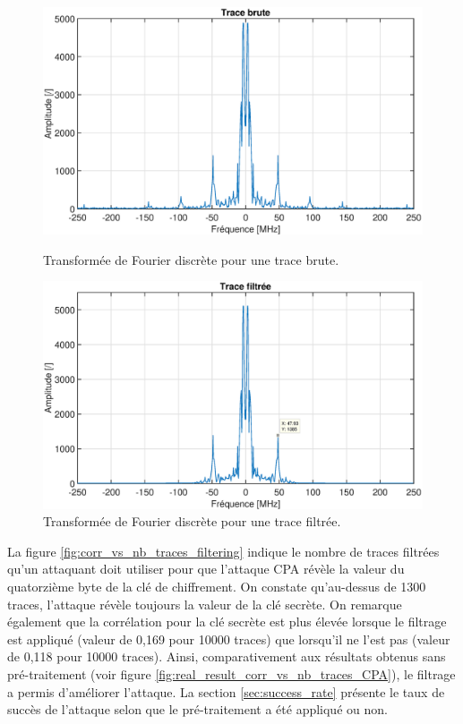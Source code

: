 \documentclass[oneside]{book}
\begin{document}
\begin{figure}[htbp]
    \hspace{-2cm}
    \includegraphics[scale=0.6]{image/trace_no_filtered}
    \caption{Transformée de Fourier discrète pour une trace brute.}
    \label{fig:trace_no_filtered} 
    \hspace{-2cm}
    \includegraphics[scale=0.6]{image/filtered_trace}
    \caption{Transformée de Fourier discrète pour une trace filtrée.}
    \label{fig:filtered_trace} 
\end{figure}

La figure \ref{fig:corr_vs_nb_traces_filtering} indique le nombre de traces filtrées qu'un attaquant doit utiliser pour que l'attaque CPA révèle la valeur du quatorzième byte de la clé de chiffrement. On constate qu'au-dessus de 1300 traces, l'attaque révèle toujours la valeur de la clé secrète. On remarque également que la corrélation pour la clé secrète est plus élevée lorsque le filtrage est appliqué (valeur de 0,169 pour 10000 traces) que lorsqu'il ne l'est pas (valeur de 0,118 pour 10000 traces). Ainsi, comparativement aux résultats obtenus sans pré-traitement (voir figure \ref{fig:real_result_corr_vs_nb_traces_CPA}), le filtrage a permis d'améliorer l'attaque. La section \ref{sec:success_rate} présente le taux de succès de l'attaque selon que le pré-traitement a été appliqué ou non.
\end{document}
